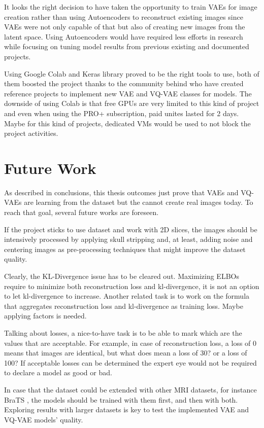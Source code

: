 It looks the right decision to have taken the opportunity to train VAEs for image creation rather than using Autoencoders to reconstruct existing images since VAEs were not only capable of that but also of creating new images from the latent space. Using Autoencoders would have required less efforts in research while focusing on tuning model results from previous existing and documented projects.

Using Google Colab and Keras library proved to be the right tools to use, both of them boosted the project thanks to the community behind who have created reference projects to implement new VAE and VQ-VAE classes for models. The downside of using Colab is that free GPUs are very limited to this kind of project and even when using the PRO+ subscription, paid unites lasted for 2 days. Maybe for this kind of projects, dedicated VMs would be used to not block the project activities.

\section{Future Work}

As described in conclusions, this thesis outcomes just prove that VAEs and VQ-VAEs are learning from the dataset but the cannot create real images today. To reach that goal, several future works are foreseen.

If the project sticks to use  dataset and work with 2D slices, the images should be intensively processed by applying skull stripping and, at least, adding noise and centering images as pre-processing techniques that might improve the dataset quality.

Clearly, the KL-Divergence issue has to be cleared out. Maximizing ELBOs require to minimize both reconstruction loss and kl-divergence, it is not an option to let kl-divergence to increase. Another related task is to work on the formula that aggregates reconstruction loss and kl-divergence as training loss. Maybe applying factors is needed. 

Talking about losses, a nice-to-have task is to be able to mark which are the values that are acceptable. For example, in case of reconstruction loss, a loss of 0 means that images are identical, but what does mean a loss of 30? or a loss of 100? If acceptable losses can be determined the expert eye would not be required to declare a model as good or bad.

In case that the  dataset could be extended with other MRI datasets, for instance BraTS \cite{brats}, the models should be trained with them first, and then with both. Exploring results with larger datasets is key to test the implemented VAE and VQ-VAE models' quality.